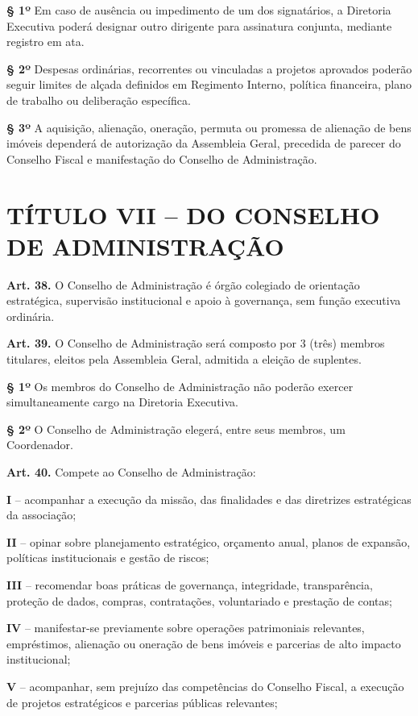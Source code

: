 \documentclass[11pt,a4paper]{article}
\begin{document}
\textbf{§ 1º} Em caso de ausência ou impedimento de um dos signatários, a Diretoria Executiva poderá designar outro dirigente para assinatura conjunta, mediante registro em ata.

\textbf{§ 2º} Despesas ordinárias, recorrentes ou vinculadas a projetos aprovados poderão seguir limites de alçada definidos em Regimento Interno, política financeira, plano de trabalho ou deliberação específica.

\textbf{§ 3º} A aquisição, alienação, oneração, permuta ou promessa de alienação de bens imóveis dependerá de autorização da Assembleia Geral, precedida de parecer do Conselho Fiscal e manifestação do Conselho de Administração.

\section*{TÍTULO VII -- DO CONSELHO DE ADMINISTRAÇÃO}

\textbf{Art. 38.} O Conselho de Administração é órgão colegiado de orientação estratégica, supervisão institucional e apoio à governança, sem função executiva ordinária.

\textbf{Art. 39.} O Conselho de Administração será composto por 3 (três) membros titulares, eleitos pela Assembleia Geral, admitida a eleição de suplentes.

\textbf{§ 1º} Os membros do Conselho de Administração não poderão exercer simultaneamente cargo na Diretoria Executiva.

\textbf{§ 2º} O Conselho de Administração elegerá, entre seus membros, um Coordenador.

\textbf{Art. 40.} Compete ao Conselho de Administração:

\textbf{I} -- acompanhar a execução da missão, das finalidades e das diretrizes estratégicas da associação;

\textbf{II} -- opinar sobre planejamento estratégico, orçamento anual, planos de expansão, políticas institucionais e gestão de riscos;

\textbf{III} -- recomendar boas práticas de governança, integridade, transparência, proteção de dados, compras, contratações, voluntariado e prestação de contas;

\textbf{IV} -- manifestar-se previamente sobre operações patrimoniais relevantes, empréstimos, alienação ou oneração de bens imóveis e parcerias de alto impacto institucional;

\textbf{V} -- acompanhar, sem prejuízo das competências do Conselho Fiscal, a execução de projetos estratégicos e parcerias públicas relevantes;
\end{document}
